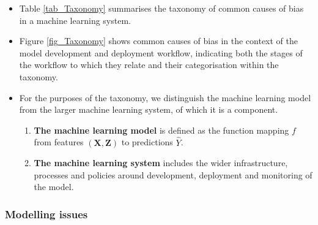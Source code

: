 \begin{itemize}[leftmargin=*]
%
\item Table \ref{tab_Taxonomy} summarises the taxonomy of common causes of bias in a machine learning system.
%
\item Figure \ref{fig_Taxonomy} shows common causes of bias in the context of the model development and deployment workflow, indicating both the stages of the workflow to which they relate and their categorisation within the taxonomy.
%
\item For the purposes of the taxonomy, we distinguish the machine learning model from the larger machine learning system, of which it is a component.
%
\begin{enumerate}[leftmargin=*]
\item \textbf{The machine learning model} is defined as the function mapping $f$ from features $(\boldsymbol{X}, \boldsymbol{Z})$ to predictions $\hat{Y}$.
\item \textbf{The machine learning system} includes the wider infrastructure, processes and policies around development, deployment and monitoring of the model.
\end{enumerate}
%
\end{itemize}

\subsubsection*{Modelling issues}

